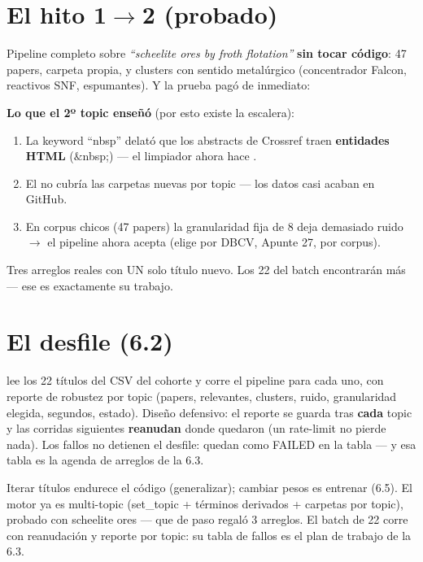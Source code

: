 \documentclass[11pt,a4paper]{article}
\begin{document}
\section{El hito 1\texorpdfstring{$\rightarrow$}{->}2 (probado)}

Pipeline completo sobre \emph{``scheelite ores by froth flotation''} \textbf{sin tocar
código}: 47 papers, carpeta propia, y clusters con sentido metalúrgico (concentrador
Falcon, reactivos SNF, espumantes). Y la prueba pagó de inmediato:

\begin{ojo}
\textbf{Lo que el 2º topic enseñó} (por esto existe la escalera):
\begin{enumerate}
  \item La keyword ``nbsp'' delató que los abstracts de Crossref traen \textbf{entidades
        HTML} ($\&$nbsp;) — el limpiador ahora hace .
  \item El  no cubría las carpetas nuevas por topic — los datos casi
        acaban en GitHub.
  \item En corpus chicos (47 papers) la granularidad fija de 8 deja demasiado ruido
        $\rightarrow$ el pipeline ahora acepta  (elige
        por DBCV, Apunte 27, por corpus).
\end{enumerate}
Tres arreglos reales con UN solo título nuevo. Los 22 del batch encontrarán más — ese es
exactamente su trabajo.
\end{ojo}

\section{El desfile (6.2)}

 lee los 22 títulos del CSV del cohorte y corre el pipeline para
cada uno, con reporte de robustez por topic (papers, relevantes, clusters, ruido,
granularidad elegida, segundos, estado). Diseño defensivo: el reporte se guarda tras
\textbf{cada} topic y las corridas siguientes \textbf{reanudan} donde quedaron (un
rate-limit no pierde nada). Los fallos no detienen el desfile: quedan como FAILED en la
tabla — y esa tabla es la agenda de arreglos de la 6.3.

\begin{resumen}
Iterar títulos endurece el código (generalizar); cambiar pesos es entrenar (6.5). El motor
ya es multi-topic (set\_topic + términos derivados + carpetas por topic), probado con
scheelite ores — que de paso regaló 3 arreglos. El batch de 22 corre con reanudación y
reporte por topic: su tabla de fallos es el plan de trabajo de la 6.3.
\end{resumen}
\clearpage
{}
{}
\end{document}
